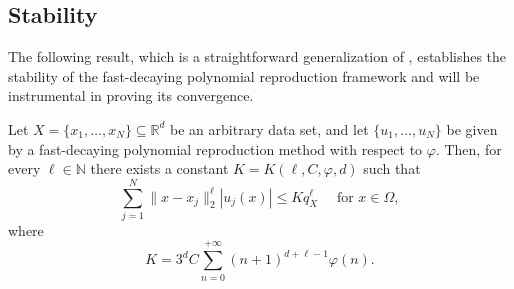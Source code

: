 \documentclass{drna}
\begin{document}
\subsection{Stability}
The following result, which is a straightforward generalization of \cite[Corollary 2.5]{demarchi2020}, establishes the stability of the fast-decaying polynomial reproduction framework and will be instrumental in proving its convergence.
\begin{theorem}
    Let $X=\{x_1,\dots,x_N\} \subseteq \mathbb{R}^d$ be an arbitrary data set, and let $\{u_1,\dots,u_N\}$ be given by a fast-decaying polynomial reproduction method with respect to $\varphi$. Then, for every $\ell \in \mathbb{N}$ there exists a constant $K=K(\ell,C,\varphi,d)$ such that 
    \begin{equation}
        \sum_{j=1}^{N} \|x-x_j\|_2^{\ell} |u_j(x)| \leq K q_{X}^{\ell} \quad \textrm{ for } x \in \Omega,
         \label{eq_stability_quasi_interpoaltion_fast_decay}
    \end{equation}
    where
    \begin{equation}
        K=3^d C \sum_{n=0}^{+\infty} (n+1)^{d+\ell-1}\varphi(n).
        \label{def_constant_K_stability}
    \end{equation}
    \label{thm_stability_quasi_interpoaltion_fast_decay}
\end{theorem}
\end{document}

